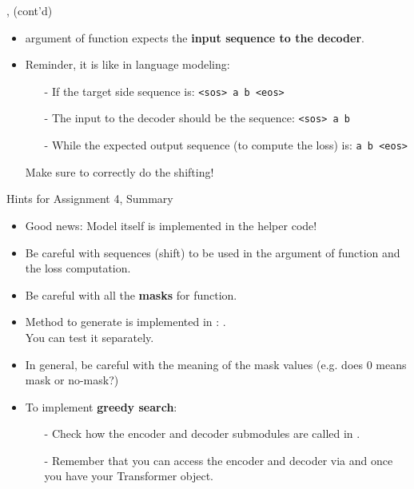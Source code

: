 \begin{frame}[fragile]{,  (cont'd)}

\begin{itemize}
\item {} argument of  function expects the \textbf{input sequence to the decoder}.
\item Reminder, it is like in language modeling: 
\begin{itemize}
\item[-] If the target side sequence is: \texttt{<sos> a b <eos>}
\item[-] The input to the decoder should be the sequence: \texttt{<sos> a b}
\item[-] While the expected output sequence (to compute the loss) is: \texttt{a b <eos>}
\end{itemize}
Make sure to correctly do the shifting!
\end{itemize}
\end{frame}


\begin{frame}[fragile]{Hints for Assignment 4, Summary}
\vspace{-5mm}
\begin{itemize}
\item Good news: Model itself is implemented in the helper code!
\item Be careful with sequences (shift) to be used in the  argument of  function and the loss computation.
\item Be careful with all the \textbf{masks} for  function.
\item Method to generate  is implemented in : .\\ You can test it separately.
\item In general, be careful with the meaning of the mask values (e.g. does 0 means mask or no-mask?)
\item To implement \textbf{greedy search}:
\begin{itemize}
\item[-] Check how the encoder and decoder submodules are called in .\\
\item[-] Remember that you can access the encoder and decoder via  and  once you have your Transformer object.
\end{itemize}
\end{itemize}
\end{frame}

